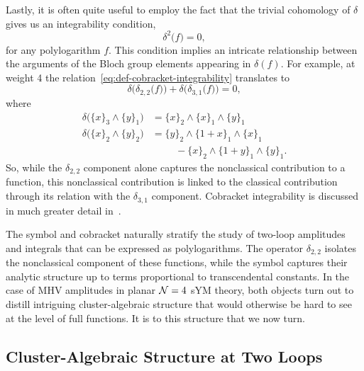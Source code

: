 \documentclass[12pt]{article}
\begin{document}
Lastly, it is often quite useful to employ the fact that the trivial cohomology of $\delta$ gives us an integrability condition,
\begin{equation}\label{eq:def-cobracket-integrability}
	\delta^2\big(f\big) = 0,
\end{equation}
for any polylogarithm $f$. This condition implies an intricate relationship between the arguments of the Bloch group elements appearing in $\delta(f)$. For example, at weight 4 the relation~\eqref{eq:def-cobracket-integrability} translates to
\begin{equation}
	\delta\big(\delta_{2,2}\big(f\big)\big) + \delta\big(\delta_{3,1}\big(f\big)\big) = 0,
\end{equation}
where
\begin{align}
\delta\big( \{x\}_3 \wedge \{y\}_1 \big)&= \{ x\}_2 \wedge \{x \}_1 \wedge \{y\}_1 \\
\delta\big( \{x\}_2 \wedge \{y\}_2 \big) &= \{ y\}_2 \wedge \{1+x\}_1 \wedge  \{x\}_1 \\
&\hspace{1cm} - \{x\}_2 \wedge  \{1+y\}_1 \wedge  \{y\}_1. \nonumber 
\end{align}
So, while the $\delta_{2,2}$ component alone captures the nonclassical contribution to a function, this nonclassical contribution is linked to the classical contribution through its relation with the $\delta_{3,1}$ component. Cobracket integrability is discussed in much greater detail in~\cite{Golden:2014xqa}.

The symbol and cobracket naturally stratify the study of two-loop amplitudes and integrals that can be expressed as polylogarithms. The operator $\delta_{2,2}$ isolates the nonclassical component of these functions, while the symbol captures their analytic structure up to terms proportional to transcendental constants. In the case of MHV amplitudes in planar ${\cal N} = 4$ sYM theory, both objects turn out to distill intriguing cluster-algebraic structure that would otherwise be hard to see at the level of full functions. It is to this structure that we now turn.

\subsection{Cluster-Algebraic Structure at Two Loops}\label{sec:cluster-algebra-R2n}
\end{document}
